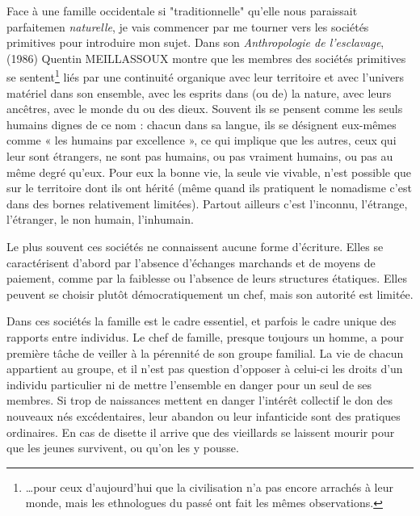 Face à une famille occidentale si "traditionnelle" qu'elle nous paraissait parfaitemen \emph{naturelle}, je vais commencer par me tourner vers les sociétés primitives pour introduire mon sujet. Dans son \emph{Anthropologie de l’esclavage}, (1986) Quentin MEILLASSOUX montre que les membres des sociétés primitives se sentent\footnote{…pour ceux d'aujourd'hui que la civilisation n'a pas encore arrachés à leur monde, mais les ethnologues du passé ont fait les mêmes observations.} liés par une continuité organique avec leur territoire et avec l'univers matériel dans son ensemble, avec les esprits dans (ou de) la nature, avec leurs ancêtres, avec le monde du ou des dieux. Souvent ils se pensent comme les seuls humains dignes de ce nom : chacun dans sa langue, ils se désignent eux-mêmes comme « les humains par excellence », ce qui implique que les autres, ceux qui leur sont étrangers, ne sont pas humains, ou pas vraiment humains, ou pas au même degré qu’eux. Pour eux la bonne vie, la seule vie vivable, n'est possible que sur le territoire dont ils ont hérité (même quand ils pratiquent le nomadisme c'est dans des bornes relativement limitées). Partout ailleurs c'est l'inconnu, l'étrange, l'étranger, le non humain, l'inhumain.

Le plus souvent ces sociétés ne connaissent aucune forme d'écriture. Elles se caractérisent d'abord par l'absence d'échanges marchands et de moyens de paiement, comme par la faiblesse ou l'absence de leurs structures étatiques. Elles peuvent se choisir plutôt démocratiquement un chef, mais son autorité est limitée. 

Dans ces sociétés la famille est le cadre essentiel, et parfois le cadre unique des rapports entre individus. Le chef de famille, presque toujours un homme, a pour première tâche de veiller à la pérennité de son groupe familial. La vie de chacun appartient au groupe, et il n'est pas question d'opposer à celui-ci les droits d'un individu particulier ni de mettre l'ensemble en danger pour un seul de ses membres. Si trop de naissances mettent en danger l'intérêt collectif le don des nouveaux nés excédentaires, leur abandon ou leur infanticide sont des pratiques ordinaires. En cas de disette il arrive que des vieillards se laissent mourir pour que les jeunes survivent, ou qu'on les y pousse.

